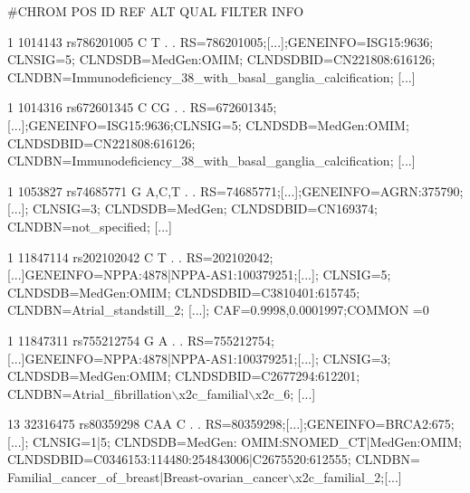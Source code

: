 \begin{DoxyCode}
\textcolor{preprocessor}{#CHROM  POS ID  REF ALT QUAL  FILTER  INFO}

1 1014143 rs786201005 C T . . RS=786201005;[...];GENEINFO=ISG15:9636; CLNSIG=5; CLNDSDB=MedGen:OMIM; 
      CLNDSDBID=CN221808:616126; CLNDBN=Immunodeficiency\_38\_with\_basal\_ganglia\_calcification; [...]

1 1014316 rs672601345 C CG  . . RS=672601345;[...];GENEINFO=ISG15:9636;CLNSIG=5; CLNDSDB=MedGen:OMIM; 
      CLNDSDBID=CN221808:616126; CLNDBN=Immunodeficiency\_38\_with\_basal\_ganglia\_calcification; [...]

1 1053827 rs74685771  G A,C,T . . RS=74685771;[...];GENEINFO=AGRN:375790;[...]; CLNSIG=3; CLNDSDB=MedGen; 
      CLNDSDBID=CN169374; CLNDBN=not\_specified; [...]

1 11847114  rs202102042 C T . . RS=202102042;[...]GENEINFO=NPPA:4878|NPPA-AS1:100379251;[...]; CLNSIG=5; 
      CLNDSDB=MedGen:OMIM; CLNDSDBID=C3810401:615745; CLNDBN=Atrial\_standstill\_2; [...]; CAF=0.9998,0.0001997;COMMON
      =0

1 11847311  rs755212754 G A . . RS=755212754;[...]GENEINFO=NPPA:4878|NPPA-AS1:100379251;[...]; CLNSIG=3; 
      CLNDSDB=MedGen:OMIM; CLNDSDBID=C2677294:612201; CLNDBN=Atrial\_fibrillation\(\backslash\)x2c\_familial\(\backslash\)x2c\_6; [...]

13  32316475  rs80359298  CAA C . . RS=80359298;[...];GENEINFO=BRCA2:675;[...]; CLNSIG=1|5; CLNDSDB=MedGen:
      OMIM:SNOMED\_CT|MedGen:OMIM; CLNDSDBID=C0346153:114480:254843006|C2675520:612555; CLNDBN=
      Familial\_cancer\_of\_breast|Breast-ovarian\_cancer\(\backslash\)x2c\_familial\_2;[...]
\end{DoxyCode}


